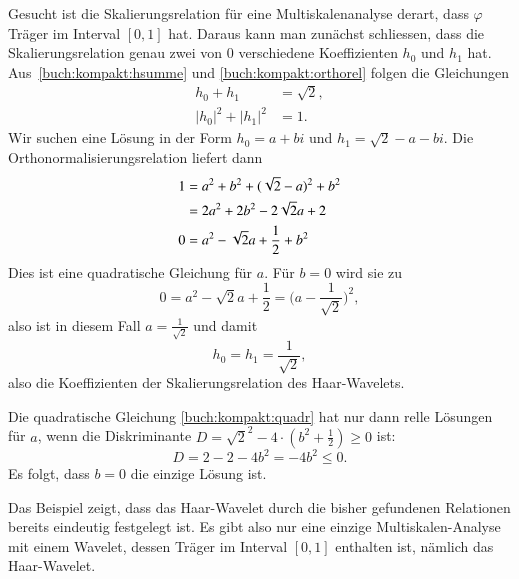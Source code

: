 \begin{beispiel}
Gesucht ist die Skalierungsrelation für eine Multiskalenanalyse derart,
dass $\varphi$ Träger im Interval $[0,1]$ hat.
Daraus kann man zunächst schliessen, dass die Skalierungsrelation
genau zwei von $0$ verschiedene Koeffizienten $h_0$ und $h_1$ hat.
Aus~\eqref{buch:kompakt:hsumme} und \eqref{buch:kompakt:orthorel}
folgen die Gleichungen
\begin{align*}
h_0+h_1&=\sqrt{2},
\\
|h_0|^2+|h_1|^2&=1.
\end{align*}
Wir suchen eine Lösung in der Form $h_0=a+bi$ und $h_1=\sqrt{2}-a-bi$.
Die Orthonormalisierungsrelation liefert dann
\begin{align}
1
&=
a^2 + b^2
+
(\sqrt{2}-a)^2 + b^2
\notag
\\
&=
2a^2 + 2b^2 - 2\sqrt{2}a + 2
\notag
\\
0
&=
a^2 - \sqrt{2}a + \frac12 + b^2
\label{buch:kompakt:quadr}
\end{align}
Dies ist eine quadratische Gleichung für $a$.
Für $b=0$ wird sie zu
\[
0
=
a^2 - \sqrt{2}a + \frac12
=
\biggl(a-\frac1{\sqrt{2}}\biggr)^2,
\]
also ist in diesem Fall $a=\frac1{\sqrt{2}}$ und damit
\[
h_0=h_1=\frac{1}{\sqrt{2}},
\]
also die Koeffizienten der Skalierungsrelation des Haar-Wavelets.

Die quadratische Gleichung \eqref{buch:kompakt:quadr} hat nur dann
relle Lösungen für $a$, wenn die Diskriminante
$D=\sqrt{2}^2 - 4\cdot (b^2+\frac12) \ge 0$ ist:
\[
D=2-2-4b^2 =-4b^2\le 0.
\]
Es folgt, dass $b=0$ die einzige Lösung ist.
\end{beispiel}

Das Beispiel zeigt, dass das Haar-Wavelet durch die bisher gefundenen
Relationen bereits eindeutig festgelegt ist.
Es gibt also nur eine einzige Multiskalen-Analyse mit einem Wavelet,
dessen Träger im Interval $[0,1]$ enthalten ist, nämlich das Haar-Wavelet.


